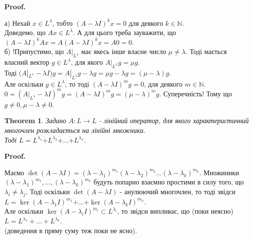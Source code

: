 \documentclass[a4paper, 10pt]{article}
\makeatletter
\theoremstyle{theoremdd}
\newtheorem{theorem}{Theorem}[subsection]
\renewenvironment{proof}[1][Proof.\\]{\par
\pushQED{\hfill \qed}%
\normalfont \topsep6\p@\@plus6\p@\relax
\trivlist
\item\relax
{\bfseries
#1\@addpunct{.}}\hspace\labelsep\ignorespaces
}{%
\popQED\endtrivlist\@endpefalse
}
\makeatother
\begin{document}
\begin{proof}
\iffalse
a) Якщо взяти базис в $L^\lambda$, то тоді кожний з базисних елементів має свою висоту. Ми зафіксуємо максимальну висоту $m$, і тоді звідси $\forall x \in L^\lambda: (A-\lambda I)^m x = 0$. Звідси випливає, що \\ $L^\lambda = \ker (A-\lambda I)^m$. Ми позначимо $B = (A-\lambda I)^m$. Оскільки $A$ з $A$ та $A$ з $I$ комутують між собою, то звідси $AB = BA$.
\fi
а) Нехай $x \in L^\lambda$, тобто $(A-\lambda I)^k x = 0$ для деякого $k \in \mathbb{N}$.\\
Доведемо, що $Ax \in L^\lambda$. А для цього треба зауважити, що $(A-\lambda I)^k Ax = A(A-\lambda I)^k x = A0 = 0$.
\bigskip \\
б) !Припустимо, що $A|_{L^\lambda}$ має якесь інше власне число $\mu \neq \lambda$. Тоді мається власний вектор $g \in L^\lambda$, для якого $A|_{L^\lambda} g = \mu g$.\\
Тоді $(A|_{L^\lambda}-\lambda I)g = A|_{L^\lambda}g - \lambda g = \mu g - \lambda g = (\mu - \lambda)g$.\\
Але оскільки $g \in L^\lambda$, то тоді $(A-\lambda I)^m g = 0$, для деякого $m \in \mathbb{N}$.\\
$0 = (A|_{L^\lambda}-\lambda I)^m g = (A-\lambda I)^m g = (\mu -\lambda)^m g$. Суперечність! Тому що $g \neq 0, \mu - \lambda \neq 0$.
\end{proof}

\begin{theorem}
Задано $A: L \to L$ - лінійний оператор, для якого характеристичний многочлен розкладається на лінійні множники.\\
Тоді $L = L^{\lambda_1} \dot{+} L^{\lambda_2} \dot{+} \dots \dot{+} L^{\lambda_k}$.
\end{theorem}

\begin{proof}
Маємо $\det(A-\lambda I) = (\lambda-\lambda_1)^{m_1} (\lambda-\lambda_2)^{m_2} \dots (\lambda-\lambda_k)^{m_k}$. Множиники $(\lambda-\lambda_1)^{m_1},\dots,(\lambda-\lambda_k)^{m_k}$ будуть попарно взаємно простими в силу того, що $\lambda_i \neq \lambda_j$. Тоді оскільки $\det (A-\lambda I)$ - анулюючий многочлен, то тоді звідси\\
$L = \ker(A-\lambda_1 I)^{m_1} \dot{+} \dots \dot{+} \ker(A-\lambda_k I)^{m_k}$.\\
Але оскільки $\ker (A-\lambda_i I)^{m_i} \subset L^{\lambda_i}$, то звідси випливає, що (поки неясно)\\
$L = L^{\lambda_1} + \dots + L^{\lambda_k}$.\\
(доведення в пряму суму теж поки не ясно).
\end{proof}
\fi
\end{document}
